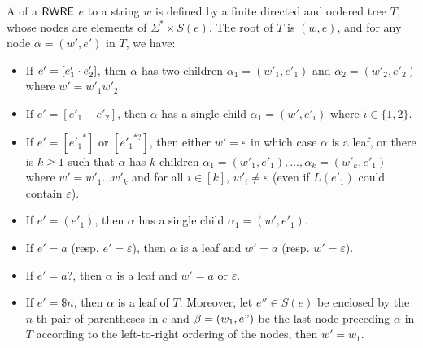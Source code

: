   \begin{definition}
  	A  of a ${\sf RWRE}$ $e$ to a string $w$ is defined by a finite directed and ordered
  	tree $T$, whose nodes are elements of $\Sigma^{\ast} \times S (e)$. %
  	The  root of $T$ is $(w, e)$, and for any node $\alpha =  	(w', e')$ in $T$, we have:
  	\begin{itemize}
  		\item If $e' = [e'_1 \cdot e'_2]$, then $\alpha$ has two children $\alpha_1 = (w'_1,
  		e'_1)$ and $\alpha_2=(w'_2, e'_2)$ where $w' = w'_1 w'_2$.
  		
  		\item If $e' = [e'_1 + e'_2]$, then $\alpha$ has a single child $\alpha_1 = (w',
  		e'_i)$ where $i \in \{ 1, 2 \}$.
  		
  		\item If $e' = [{e'_1}^{\ast}]$ or $[{e'_1}^{\ast ?}]$, then either $w' = \varepsilon$ in which case $\alpha$ is a
  		leaf, or there is $k \geqslant 1$ such that $\alpha$ has $k$ children $\alpha_1 = (w'_1,
  		e'_1), \ldots, \alpha_k = (w'_k, e'_1)$ where $w' = w'_1 \ldots w'_k$ and for all
  		$i \in [k]$, $w'_i \neq \varepsilon$ (even if  $L
  		(e'_1)$ could contain $\varepsilon$).
%
%		
  		\item If $e' = (e'_1)$, then $\alpha$ has a single child $\alpha_1 = (w', e'_1)$.
  		\item If $e' = a$ (resp. $e' = \varepsilon$), then $\alpha$ is a leaf and
  		$w' = a$ (resp. $w' = \varepsilon$).
%		
  		\item If $e' = a?$, then $\alpha$ is a leaf and
  		$w' = a$ or $\varepsilon$.
%
		\item If $e' = \$n$, then $\alpha$ is a leaf of $T$. Moreover, let $e'' \in S(e)$ be enclosed by the $n$-th pair of parentheses in $e$ and $\beta = (w_1, e")$ be the last node preceding $\alpha$ in $T$ %
		according to the left-to-right ordering of the nodes, then $w' = w_1$.
  	\end{itemize}
  	

\end{definition}
